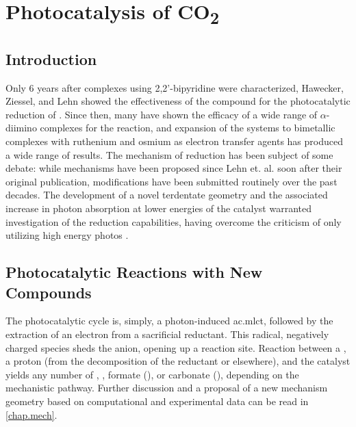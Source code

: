 \chapter{Photocatalysis of \texorpdfstring{CO\textsubscript{2}}{CO2}}\label{chap.co2}

\section{Introduction}

Only 6 years after  complexes using 2,2'-bipyridine were characterized, Hawecker, Ziessel, and Lehn showed the effectiveness of the compound for the photocatalytic reduction of \autocite{hawecker1983}. Since then, many have shown the efficacy of a wide range of $\alpha$-diimino complexes for the reaction, and expansion of the systems to bimetallic complexes with ruthenium and osmium as electron transfer agents has produced a wide range of results. The mechanism of reduction has been subject of some debate: while mechanisms have been proposed since Lehn et. al. soon after their original publication\autocite{hawecker1986}, modifications have been submitted routinely over the past decades. The development of a novel terdentate geometry and the associated increase in photon absorption at lower energies of the catalyst warranted investigation of the  reduction capabilities, having overcome the criticism of only utilizing high energy photos \autocite{kutal1985}. 

\section{Photocatalytic Reactions with New Compounds}

The photocatalytic cycle is, simply, a photon-induced \gls{ac.mlct}, followed by the extraction of an electron from a sacrificial reductant. This radical, negatively charged species sheds the anion, opening up a reaction site. Reaction between a , a proton (from the decomposition of the reductant or elsewhere), and the catalyst yields any number of , , formate (), or carbonate (), depending on the mechanistic pathway. Further discussion and a proposal of a new mechanism geometry based on computational and experimental data can be read in \autoref{chap.mech}.




